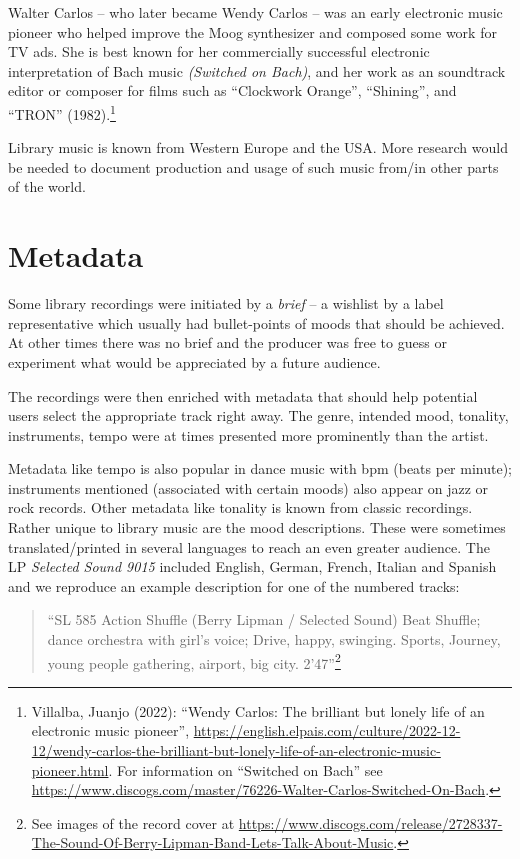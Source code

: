 \documentclass[a4paper,
fontsize=11pt,
oneside,
numbers=noperiodatend,
parskip=half-,
bibliography=totoc,
final
]{scrartcl}
\begin{document}
Walter Carlos -- who later became Wendy Carlos -- was an early
electronic music pioneer who helped improve the Moog synthesizer and
composed some work for TV ads. She is best known for her commercially
successful electronic interpretation of Bach music \emph{(Switched on
Bach)}, and her work as an soundtrack editor or composer for films such
as \enquote{Clockwork Orange}, \enquote{Shining}, and \enquote{TRON}
(1982).\footnote{Villalba, Juanjo (2022): \enquote{Wendy Carlos: The
  brilliant but lonely life of an electronic music pioneer},
  \url{https://english.elpais.com/culture/2022-12-12/wendy-carlos-the-brilliant-but-lonely-life-of-an-electronic-music-pioneer.html}.
  For information on \enquote{Switched on Bach} see
  \url{https://www.discogs.com/master/76226-Walter-Carlos-Switched-On-Bach}.}

Library music is known from Western Europe and the USA. More research
would be needed to document production and usage of such music from/in
other parts of the world.

\hypertarget{metadata}{%
\section{Metadata}\label{metadata}}

Some library recordings were initiated by a \emph{brief} -- a wishlist
by a label representative which usually had bullet-points of moods that
should be achieved. At other times there was no brief and the producer
was free to guess or experiment what would be appreciated by a future
audience.

The recordings were then enriched with metadata that should help
potential users select the appropriate track right away. The genre,
intended mood, tonality, instruments, tempo were at times presented more
prominently than the artist.

Metadata like tempo is also popular in dance music with bpm (beats per
minute); instruments mentioned (associated with certain moods) also
appear on jazz or rock records. Other metadata like tonality is known
from classic recordings. Rather unique to library music are the mood
descriptions. These were sometimes translated/printed in several
languages to reach an even greater audience. The LP \emph{Selected Sound
9015} included English, German, French, Italian and Spanish and we
reproduce an example description for one of the numbered tracks:

\begin{quote}
\enquote{SL 585 Action Shuffle (Berry Lipman / Selected Sound) Beat
Shuffle; dance orchestra with girl's voice; Drive, happy, swinging.
Sports, Journey, young people gathering, airport, big city.
2'47}\footnote{See images of the record cover at
  \url{https://www.discogs.com/release/2728337-The-Sound-Of-Berry-Lipman-Band-Lets-Talk-About-Music}.}
\end{quote}
\end{document}

